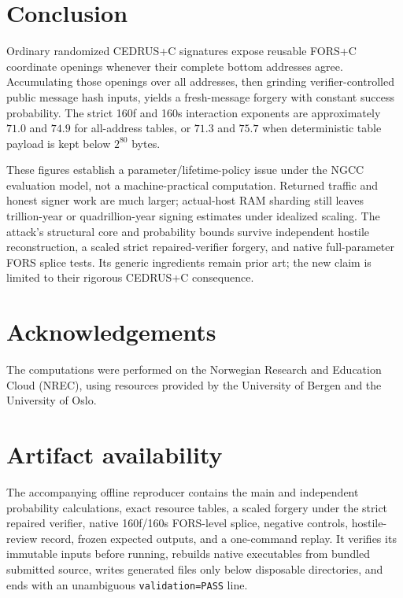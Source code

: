 \documentclass[11pt,a4paper]{article}
\begin{document}
\section{Conclusion}

Ordinary randomized CEDRUS+C signatures expose reusable FORS+C coordinate
openings whenever their complete bottom addresses agree.  Accumulating those
openings over all addresses, then grinding verifier-controlled public message
hash inputs, yields a fresh-message forgery with constant success probability.
The strict 160f and 160s interaction exponents are approximately $71.0$ and
$74.9$ for all-address tables, or $71.3$ and $75.7$ when deterministic table
payload is kept below $2^{80}$ bytes.

These figures establish a parameter/lifetime-policy issue under the NGCC
evaluation model, not a machine-practical computation.  Returned traffic and
honest signer work are much larger; actual-host RAM sharding still leaves
trillion-year or quadrillion-year signing estimates under idealized scaling.
The attack's structural core and probability bounds survive independent
hostile reconstruction, a scaled strict repaired-verifier forgery, and native
full-parameter FORS splice tests.  Its generic ingredients remain prior art;
the new claim is limited to their rigorous CEDRUS+C consequence.

\section*{Acknowledgements}

The computations were performed on the Norwegian Research and Education Cloud
(NREC), using resources provided by the University of Bergen and the University
of Oslo.

\section*{Artifact availability}

The accompanying offline reproducer contains the main and independent
probability calculations, exact resource tables, a scaled forgery under the
strict repaired verifier, native 160f/160s FORS-level splice, negative controls, hostile-review
record, frozen expected outputs, and a one-command replay.  It verifies its
immutable inputs before running, rebuilds native executables from bundled
submitted source, writes generated files only below disposable directories,
and ends with an unambiguous \texttt{validation=PASS} line.
\end{document}
